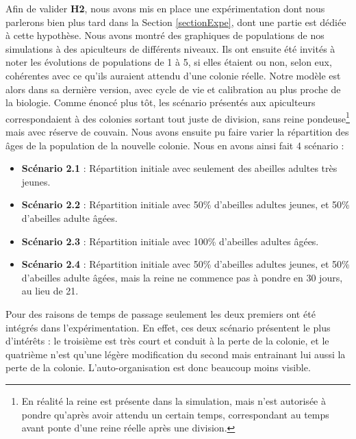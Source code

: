 			Afin de valider \textbf{H2}, nous avons mis en place une expérimentation dont nous parlerons bien plus tard dans la Section \ref{sectionExpe}, dont une partie est dédiée à cette hypothèse. Nous avons montré des graphiques de populations de nos simulations à des apiculteurs de différents niveaux. Ils ont ensuite été invités à noter les évolutions de populations de 1 à 5, si elles étaient ou non, selon eux, cohérentes avec ce qu'ils auraient attendu d'une colonie réelle. Notre modèle est alors dans sa dernière version, avec cycle de vie et calibration au plus proche de la biologie. Comme énoncé plus tôt, les scénario présentés aux apiculteurs correspondaient à des colonies sortant tout juste de division, sans reine pondeuse\footnote{En réalité la reine est présente dans la simulation, mais n'est autorisée à pondre qu'après avoir attendu un certain temps, correspondant au temps avant ponte d'une reine réelle après une division.} mais avec réserve de couvain. Nous avons ensuite pu faire varier la répartition des âges de la population de la nouvelle colonie. Nous en avons ainsi fait 4 scénario :
				\begin{itemize}
					\item \textbf{Scénario 2.1} : Répartition initiale avec seulement des abeilles adultes très jeunes.
					\item \textbf{Scénario 2.2} : Répartition initiale avec 50\% d'abeilles adultes jeunes, et 50\% d'abeilles adulte âgées.
					\item \textbf{Scénario 2.3} : Répartition initiale avec 100\% d'abeilles adultes âgées.
					\item \textbf{Scénario 2.4} : Répartition initiale avec 50\% d'abeilles adultes jeunes, et 50\% d'abeilles adulte âgées, mais la reine ne commence pas à pondre en 30 jours, au lieu de 21.
				\end{itemize}
				
				Pour des raisons de temps de passage seulement les deux premiers ont été intégrés dans l'expérimentation. En effet, ces deux scénario présentent le plus d'intérêts : le troisième est très court et conduit à la perte de la colonie, et le quatrième n'est qu'une légère modification du second mais entrainant lui aussi la perte de la colonie. L'auto-organisation est donc beaucoup moins visible.
				

